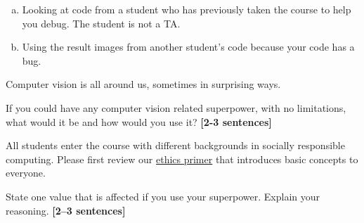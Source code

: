 \documentclass{csci1430}
\begin{document}
\begin{enumerate}[(a)]

\item
Looking at code from a student who has previously taken the course to help you debug. The student is not a TA.


\item
Using the result images from another student's code because your code has a bug.


\end{enumerate}

\pagebreak %

\begin{question}[points=8,drawbox=false]
Computer vision is all around us, sometimes in surprising ways.
\end{question}

\begin{subquestion}[points=2]
If you could have any computer vision related superpower, with no limitations, what would it be and how would you use it? \textbf{[2-3 sentences]}
\end{subquestion}

\begin{answer}[height=7]

\end{answer}


\begin{subquestion}[points=6,drawbox=false]
All students enter the course with different backgrounds in socially responsible computing. Please first review our \href{https://browncsci1430.github.io/resources/ethics_primer/}{ethics primer} that introduces basic concepts to everyone.
\end{subquestion}

\begin{subsubquestion}[points=3]
State one value that is affected if you use your superpower. Explain your reasoning. \textbf{[2--3 sentences]}
\end{subsubquestion}
    
\end{document}
